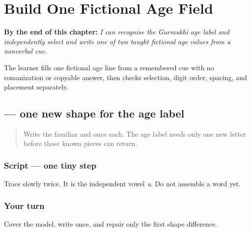 
\chapter{Build One Fictional Age Field}
\label{ch:pa-form-age-runway}

\begin{chapteropening}
\textbf{By the end of this chapter:} \emph{I can recognise the Gurmukhi age label and independently select and write one of two taught fictional age values from a nonverbal cue.}

The learner fills one fictional age line from a remembered cue with no romanization or copyable answer, then checks selection, digit order, spacing, and placement separately.
\end{chapteropening}

\section[\texorpdfstring{\pa{ਉ} (u)}{ਉ (u)}]{ — one new shape for the age label}

\label{lesson:PA-W07-independent-u}



\begin{quote}
Write the familiar \textbf{} and \textbf{} once each. The age label needs only one new letter before those known pieces can return.
\end{quote}

\subsection*{Script — one tiny step}
Trace \textbf{} slowly twice. It is the independent vowel \emph{u}. Do not assemble a word yet.

\subsection*{Your turn}
Cover the model, write \textbf{} once, and repair only the first shape difference.

